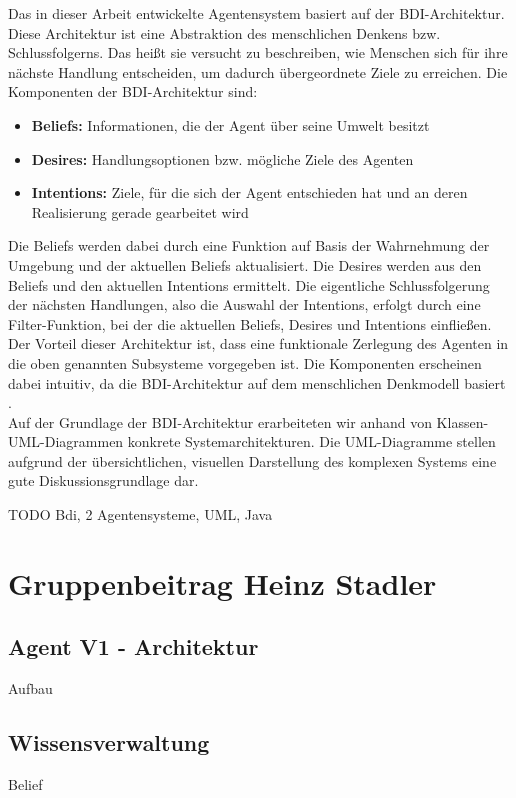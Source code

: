 \documentclass[runningheads]{llncs}
\begin{document}
Das in dieser Arbeit entwickelte Agentensystem basiert auf der BDI-Architektur. Diese Architektur ist eine Abstraktion des menschlichen Denkens bzw. Schlussfolgerns. Das heißt sie versucht zu beschreiben, wie Menschen sich für ihre nächste Handlung entscheiden, um dadurch übergeordnete Ziele zu erreichen. Die Komponenten der BDI-Architektur sind:
\begin{itemize}
\item{{\bf Beliefs:} Informationen, die der Agent über seine Umwelt besitzt}
\item{{\bf Desires:} Handlungsoptionen bzw. mögliche Ziele des Agenten}
\item{{\bf Intentions:} Ziele, für die sich der Agent entschieden hat und an deren Realisierung gerade gearbeitet wird}
\end{itemize}

Die Beliefs werden dabei durch eine Funktion auf Basis der Wahrnehmung der Umgebung und der aktuellen Beliefs aktualisiert. Die Desires werden aus den Beliefs und den aktuellen Intentions ermittelt. Die eigentliche Schlussfolgerung der nächsten Handlungen, also die Auswahl der Intentions, erfolgt durch eine Filter-Funktion, bei der die aktuellen Beliefs, Desires und Intentions einfließen. Der Vorteil dieser Architektur ist, dass eine funktionale Zerlegung des Agenten in die oben genannten Subsysteme vorgegeben ist. Die Komponenten erscheinen dabei intuitiv, da die BDI-Architektur auf dem menschlichen Denkmodell basiert \cite{Weiss2000}.\\

Auf der Grundlage der BDI-Architektur erarbeiteten wir anhand von Klassen-UML-Diagrammen konkrete Systemarchitekturen. Die UML-Diagramme stellen aufgrund der übersichtlichen, visuellen Darstellung des komplexen Systems eine gute Diskussionsgrundlage dar.

TODO Bdi, 2 Agentensysteme, UML, Java

\section{Gruppenbeitrag Heinz Stadler}
 
\subsection{Agent V1 - Architektur}
Aufbau

\subsection{Wissensverwaltung}
Belief
\end{document}
